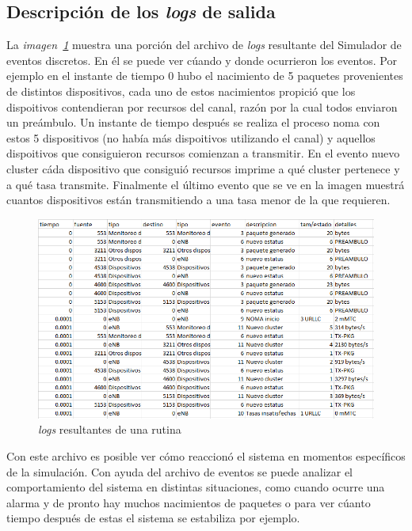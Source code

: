 \subsection{Descripción de los \textit{logs} de salida}

La \textit{imagen~\ref{fig:logsdes}} muestra una porción del archivo de \textit{logs} resultante del Simulador de eventos discretos. En él se puede ver cúando y donde ocurrieron los eventos. Por ejemplo en el instante de tiempo 0 hubo el nacimiento de 5 paquetes provenientes de distintos dispositivos, cada uno de estos nacimientos propició que los dispoitivos contendieran por recursos del canal, razón por la cual todos enviaron un preámbulo. Un instante de tiempo después se realiza el proceso noma con estos 5 dispositivos (no había más dispoitivos utilizando el canal) y aquellos dispoitivos que consiguieron recursos comienzan a transmitir. En el evento nuevo cluster cáda dispositivo que consiguió recursos imprime a qué cluster pertenece y a qué tasa transmite. Finalmente el último evento que se ve en la imagen muestrá cuantos dispositivos están transmitiendo a una tasa menor de la que requieren. \newline

\begin{figure}[th]
    \centering
    \includegraphics[scale=0.8]{Figures/logsdes.png}
    \decoRule
    \caption[\textit{logs} resultantes de una rutina]{\textit{logs} resultantes de una rutina}
    \label{fig:logsdes}
\end{figure}

Con este archivo es posible ver cómo reaccionó el sistema en momentos específicos de la simulación. Con ayuda del archivo de eventos se puede analizar el comportamiento del sistema en distintas situaciones, como cuando ocurre una alarma y de pronto hay muchos nacimientos de paquetes o para ver cúanto tiempo después de estas el sistema se estabiliza por ejemplo. \newline

